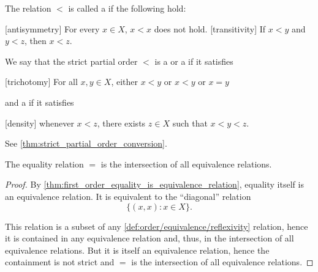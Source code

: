 \begin{definition}
\begin{defenum}
    \cite[168]{Enderton1977} The relation \( < \) is called a  if the following hold:
    \begin{description}
      [antisymmetry] For every \( x \in X \), \( x < x \) does not hold.
      [transitivity] If \( x < y \) and \( y < z \), then \( x < z \).
    \end{description}

    We say that the strict partial order \( < \) is a  or a  if it satisfies
    \begin{description}
      [trichotomy] For all \( x, y \in X \), either \( x < y \) or \( x < y \) or \( x = y \)
    \end{description}
    and a  if it satisfies
    \begin{description}
      [density] whenever \( x < z \), there exists \( z \in X \) such that \( x < y < z \).
    \end{description}

    See \cref{thm:strict_partial_order_conversion}.
  \end{defenum}
\end{definition}

\begin{proposition}\label{thm:equality_is_smallest_equivalence_relation}
  The equality relation \( = \) is the intersection of all equivalence relations.
\end{proposition}
\begin{proof}
  By \cref{thm:first_order_equality_is_equivalence_relation}, equality itself is an equivalence relation. It is equivalent to the \enquote{diagonal} relation
  \begin{equation*}
    \{ (x, x) \colon x \in X \}.
  \end{equation*}

  This relation is a subset of any \ref{def:order/equivalence/reflexivity} relation, hence it is contained in any equivalence relation and, thus, in the intersection of all equivalence relations. But it is itself an equivalence relation, hence the containment is not strict and \( = \) is the intersection of all equivalence relations.
\end{proof}

